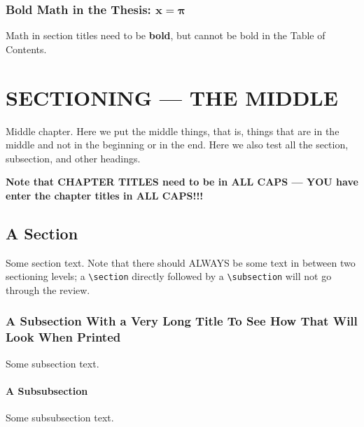 \subsection[Non-Bold Math in the TOC: $x=2\pi/e$]{Bold Math in the Thesis:  $\mathbf{x=\pi}$}

Math in section titles need to be \textbf{bold}, but cannot be bold in
the Table of Contents.

\chapter{SECTIONING --- THE MIDDLE} \label{chapter:middle}

Middle chapter.  Here we put the middle things, that is, things that
are in the middle and not in the beginning or in the end.  Here we
also test all the section, subsection, and other headings.

\textbf{Note that
  CHAPTER TITLES need to be in ALL CAPS --- YOU have enter the chapter
  titles in ALL CAPS!!!}

\section{A Section}
\label{secone}

Some section text.  Note that there should ALWAYS be some text in
between two sectioning levels; a \verb+\section+ directly followed by
a \verb+\subsection+ will not go through the review.

\subsection{A Subsection With a Very Long Title To See How That Will
  Look When Printed}
\label{lonelysubsection}

Some subsection text.

\subsubsection{A Subsubsection}
\label{lonelysubsubsection}

Some subsubsection text.

